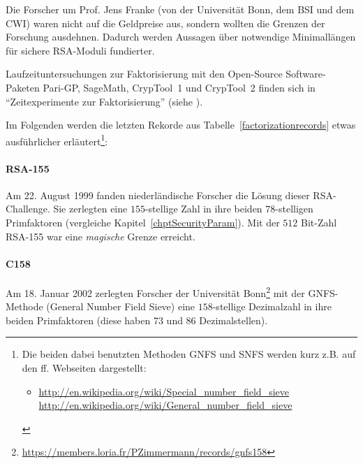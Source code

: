 \begin{refsegment}
{Die Forscher um Prof. Jens Franke (von der Universität Bonn, dem BSI und dem
CWI) waren nicht auf die Geldpreise aus, sondern wollten die Grenzen der
Forschung ausdehnen. Dadurch werden Aussagen über notwendige Minimallängen
für sichere RSA-Moduli fundierter.
}



Laufzeituntersuchungen zur Faktorisierung mit den
Open-Source Software-Paketen Pari-GP, SageMath, CrypTool~1 und CrypTool~2
finden sich in "`Zeitexperimente zur Faktorisierung"' (siehe \cite{Schulz2010}).

%
Im Folgenden werden die letzten Rekorde aus Tabelle~\ref{factorizationrecords}
etwas ausführlicher erläutert\footnote{%
Die beiden dabei benutzten Methoden GNFS und SNFS werden kurz z.B. auf
den ff. Webseiten dargestellt:
\begin{itemize}
\item[]
      \url{http://en.wikipedia.org/wiki/Special_number_field_sieve}\\
      \url{http://en.wikipedia.org/wiki/General_number_field_sieve}
\end{itemize}
}:


\paragraph*{RSA-155} \label{RSA-155} 
\mbox{} %

Am 22. August 1999 fanden niederländische Forscher die Lösung dieser
RSA-Challenge. Sie zerlegten eine $155$-stellige Zahl in ihre beiden $78$-stelligen
Primfaktoren (vergleiche Kapitel~\ref{chptSecurityParam}).
Mit der $512$ Bit-Zahl RSA-155 war eine {\em magische} Grenze erreicht.



\paragraph*{C158} \label{C158} 
\mbox{} %
\hypertarget{C158-chap3}{}

Am 18. Januar 2002 zerlegten Forscher der Universität Bonn\footnote{%
  \url{https://members.loria.fr/PZimmermann/records/gnfs158}
}
mit der GNFS-Methode (General Number Field Sieve)  eine $158$-stellige Dezimalzahl in ihre beiden Primfaktoren
(diese haben 73 und 86 Dezimalstellen).


\end{refsegment}
